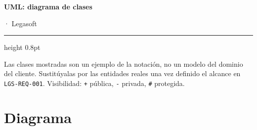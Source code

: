 \documentclass[11pt,a4paper]{article}
\begin{document}
\begin{center}
{\sffamily\bfseries\LARGE\color{lgPrimario} UML: diagrama de clases\par}
\vspace{2pt}
{\sffamily\normalsize\color{lgGris}  · Legasoft\par}
\end{center}
\vspace{6pt}
{\color{lgBorde}\hrule height 0.8pt}
\vspace{10pt}

\begin{porcompletar}
Las clases mostradas son un ejemplo de la notación, no un modelo del dominio del
cliente. Sustitúyalas por las entidades reales una vez definido el alcance en
\texttt{LGS-REQ-001}. Visibilidad: \texttt{+} pública, \texttt{-} privada,
\texttt{\#} protegida.
\end{porcompletar}

\section*{Diagrama}
\end{document}
